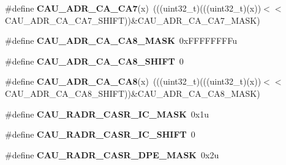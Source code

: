 \begin{DoxyCompactItemize}
\item 
\#define {\bfseries C\+A\+U\+\_\+\+A\+D\+R\+\_\+\+C\+A\+\_\+\+C\+A7}(x)~(((uint32\+\_\+t)(((uint32\+\_\+t)(x))$<$$<$C\+A\+U\+\_\+\+A\+D\+R\+\_\+\+C\+A\+\_\+\+C\+A7\+\_\+\+S\+H\+I\+FT))\&C\+A\+U\+\_\+\+A\+D\+R\+\_\+\+C\+A\+\_\+\+C\+A7\+\_\+\+M\+A\+SK)\hypertarget{group__CAU__Register__Masks_gaac9f48ae12da632ac356d3024c5a1ff0}{}\label{group__CAU__Register__Masks_gaac9f48ae12da632ac356d3024c5a1ff0}

\item 
\#define {\bfseries C\+A\+U\+\_\+\+A\+D\+R\+\_\+\+C\+A\+\_\+\+C\+A8\+\_\+\+M\+A\+SK}~0x\+F\+F\+F\+F\+F\+F\+F\+Fu\hypertarget{group__CAU__Register__Masks_ga588ce6c296b5bc630763b325bca7e346}{}\label{group__CAU__Register__Masks_ga588ce6c296b5bc630763b325bca7e346}

\item 
\#define {\bfseries C\+A\+U\+\_\+\+A\+D\+R\+\_\+\+C\+A\+\_\+\+C\+A8\+\_\+\+S\+H\+I\+FT}~0\hypertarget{group__CAU__Register__Masks_ga4438c1d48ac4e4e715fdd705f409e0fc}{}\label{group__CAU__Register__Masks_ga4438c1d48ac4e4e715fdd705f409e0fc}

\item 
\#define {\bfseries C\+A\+U\+\_\+\+A\+D\+R\+\_\+\+C\+A\+\_\+\+C\+A8}(x)~(((uint32\+\_\+t)(((uint32\+\_\+t)(x))$<$$<$C\+A\+U\+\_\+\+A\+D\+R\+\_\+\+C\+A\+\_\+\+C\+A8\+\_\+\+S\+H\+I\+FT))\&C\+A\+U\+\_\+\+A\+D\+R\+\_\+\+C\+A\+\_\+\+C\+A8\+\_\+\+M\+A\+SK)\hypertarget{group__CAU__Register__Masks_gad97c6437bc1de70a75242ffd964b973f}{}\label{group__CAU__Register__Masks_gad97c6437bc1de70a75242ffd964b973f}

\item 
\#define {\bfseries C\+A\+U\+\_\+\+R\+A\+D\+R\+\_\+\+C\+A\+S\+R\+\_\+\+I\+C\+\_\+\+M\+A\+SK}~0x1u\hypertarget{group__CAU__Register__Masks_ga8b83182cdf0c23dd0359bdd4bde2e770}{}\label{group__CAU__Register__Masks_ga8b83182cdf0c23dd0359bdd4bde2e770}

\item 
\#define {\bfseries C\+A\+U\+\_\+\+R\+A\+D\+R\+\_\+\+C\+A\+S\+R\+\_\+\+I\+C\+\_\+\+S\+H\+I\+FT}~0\hypertarget{group__CAU__Register__Masks_gaaaed76b153aa3db1dd33853bd41f890f}{}\label{group__CAU__Register__Masks_gaaaed76b153aa3db1dd33853bd41f890f}

\item 
\#define {\bfseries C\+A\+U\+\_\+\+R\+A\+D\+R\+\_\+\+C\+A\+S\+R\+\_\+\+D\+P\+E\+\_\+\+M\+A\+SK}~0x2u\hypertarget{group__CAU__Register__Masks_gae77a40261939bae263003192796104ac}{}\label{group__CAU__Register__Masks_gae77a40261939bae263003192796104ac}


\end{DoxyCompactItemize}
